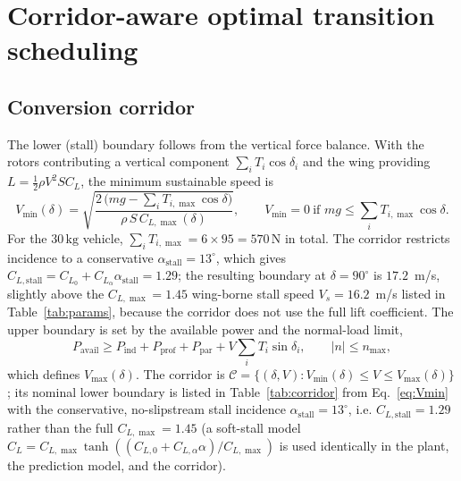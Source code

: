 \documentclass[preprint,3p,11pt]{elsarticle}
\newcommand{\SI}[2]{\ensuremath{#1\,#2}}
\newcommand{\kilogram}{\mathrm{kg}}
\newcommand{\newton}{\mathrm{N}}
\begin{document}
\section{Corridor-aware optimal transition scheduling}\label{sec:corridor}

\subsection{Conversion corridor}\label{sec:corridorderiv}
The lower (stall) boundary follows from the vertical force balance. With the
rotors contributing a vertical component $\sum_i T_i\cos\delta_i$ and the wing
providing $L=\tfrac12\rho V^2 S C_L$, the minimum sustainable speed is
\begin{equation}
V_{\min}(\delta)=
\sqrt{\frac{2\,\bigl(mg-\sum_i T_{i,\max}\cos\delta\bigr)}
{\rho\,S\,C_{L,\max}(\delta)}},
\qquad V_{\min}=0\ \text{if }mg\le\sum_i T_{i,\max}\cos\delta .
\label{eq:Vmin}
\end{equation}
For the \SI{30}{\kilogram} vehicle, $\sum_i T_{i,\max}=6\times95=\SI{570}{\newton}$
in total. The corridor restricts incidence to a conservative
$\alpha_{\mathrm{stall}}=13^\circ$, which gives
$C_{L,\mathrm{stall}}=C_{L_0}+C_{L_\alpha}\alpha_{\mathrm{stall}}=1.29$;
the resulting boundary at $\delta=90^\circ$ is $17.2$~m/s, slightly above the
$C_{L,\max}=1.45$ wing-borne stall speed $V_s=16.2$~m/s listed in
Table~\ref{tab:params}, because the corridor does not use the full lift
coefficient. The upper boundary is set by the
available power and the normal-load limit,
\begin{equation}
P_{\mathrm{avail}}\ge P_{\mathrm{ind}}+P_{\mathrm{prof}}+P_{\mathrm{par}}
 +V\!\sum_i T_i\sin\delta_i,\qquad |n|\le n_{\max},
\label{eq:Vmax}
\end{equation}
which defines $V_{\max}(\delta)$. The corridor is
$\mathcal{C}=\{(\delta,V):V_{\min}(\delta)\le V\le V_{\max}(\delta)\}$; its
nominal lower boundary is listed in Table~\ref{tab:corridor} from
Eq.~\eqref{eq:Vmin} with the conservative, no-slipstream stall incidence
$\alpha_{\mathrm{stall}}=13^\circ$, i.e. $C_{L,\mathrm{stall}}=1.29$ rather
than the full $C_{L,\max}=1.45$ (a soft-stall model
$C_L=C_{L,\max}\tanh((C_{L,0}+C_{L,\alpha}\alpha)/C_{L,\max})$ is used
identically in the plant, the prediction model, and the corridor).
\end{document}

